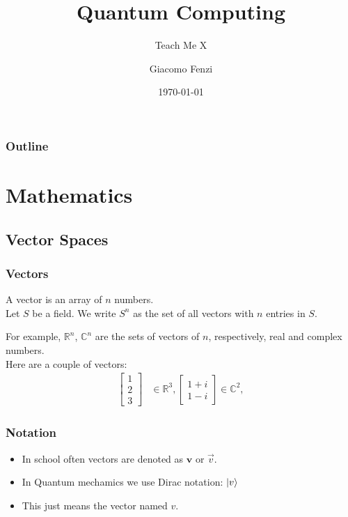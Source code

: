 \documentclass{beamer}
\title{Quantum Computing}
\subtitle{Teach Me X}
\author{Giacomo Fenzi}
\institute{University of St. Andrews}
\date{\today}
\begin{document}
    \begin{frame}
        \titlepage
    \end{frame}
    \begin{frame}
        \frametitle{Outline}
        \tableofcontents
    \end{frame}
    \section{Mathematics}
    \subsection{Vector Spaces}
    \begin{frame}
        \frametitle{Vectors}
        A vector is an array of $n$ numbers. \\
        Let $S$ be a field. We write $S^n$ as the set of all vectors with $n$ entries in $S$.
        \begin{example}
            For example, $\mathbb{R}^n$, $\mathbb{C}^n$  are the sets of vectors of $n$, respectively, real and complex numbers. \\
            Here are a couple of vectors:
            \begin{align}
                \begin{bmatrix}
                       1 \\
                       2 \\
                       3
                \end{bmatrix} &\in \mathbb{R}^3, 
                \begin{bmatrix}
                    1 + i \\
                    1 - i 
             \end{bmatrix} \in \mathbb{C}^2, 
              \end{align}
        \end{example}
    \end{frame}
    \begin{frame}
        \frametitle{Notation}
        \begin{itemize}
            \item In school often vectors are denoted as $\boldsymbol{v}$ or $\vec{v}$.
            \item In Quantum mechamics we use Dirac notation: $\ket{v}$
            \item This just means the vector named $v$. 
        \end{itemize}
    \end{frame}
\end{document}
